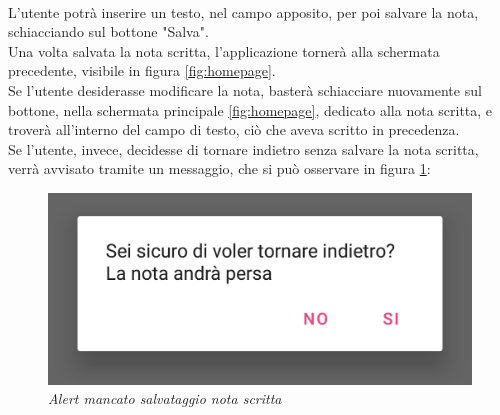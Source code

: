 \\L'utente potrà inserire un testo, nel campo apposito, per poi salvare la nota, schiacciando sul bottone "Salva".
\\Una volta salvata la nota scritta, l'applicazione tornerà alla schermata precedente, visibile in figura \ref{fig:homepage}.
\\Se l'utente desiderasse modificare la nota, basterà schiacciare nuovamente sul bottone, nella schermata principale \ref{fig:homepage}, dedicato alla nota scritta, e troverà all'interno del campo di testo, ciò che aveva scritto in precedenza.
\\Se l'utente, invece, decidesse di tornare indietro senza salvare la nota scritta, verrà avvisato tramite un messaggio, che si può osservare in figura \ref{fig:alertnota}:
\begin{figure}[!h]
    \centering
	\includegraphics[scale=0.25]{Tesi/images/AlertNota}
	\caption{\textit{Alert mancato salvataggio nota scritta}}
	\label{fig:alertnota}
\end{figure}


